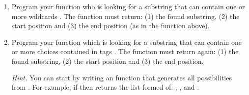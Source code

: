 \documentclass[11pt,class=report,crop=false]{standalone}
\begin{document}
\begin{activite}


\begin{enumerate}
  \item Program your  function
  who is looking for a substring that can contain one or more wildcards \og{}\fg{}.
  The function must return: (1) the found substring, (2) the start position and (3) the end position (as in the  function above).
  
  
  \item Program your  function
  which is looking for a substring that can contain one or more choices contained in tags \og{}\mot{[]}\fg{}. The function must return again: (1) the found substring, (2) the start position and (3) the end position.  
  
  \emph{Hint.} You can start by writing an  function that generates all possibilities from . For example, if 
   then  returns the list formed of:
  , ,  and .
    
\end{enumerate}   
     
\end{activite}


\newcommand{\rzero}{{\color{red}\textbf{0}}}
\newcommand{\run}{{\color{blue}\textbf{1}}}
\end{document}
